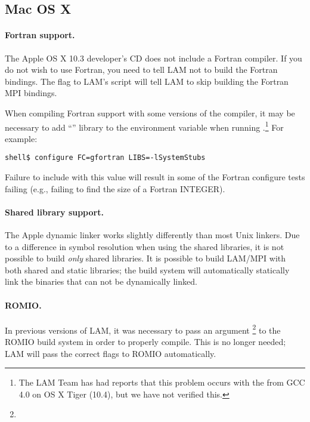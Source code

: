 \subsection{Mac OS X}

\paragraph{Fortran support.} The Apple OS X 10.3 developer's CD does
not include a Fortran compiler.  If you do not wish to use Fortran,
you need to tell LAM not to build the Fortran bindings.  The
 flag to LAM's  script will tell
LAM to skip building the Fortran MPI bindings.


When compiling Fortran support with some versions of the
 compiler, it may be necessary to add
``'' library to the  environment
variable when running .\footnote{The LAM Team has had
  reports that this problem occurs with the  from GCC
  4.0 on OS X Tiger (10.4), but we have not verified this.}  For
example:

\lstset{style=lam-cmdline}
\begin{lstlisting}
shell$ configure FC=gfortran LIBS=-lSystemStubs
\end{lstlisting}

Failure to include  with this value will result in some
of the Fortran configure tests failing (e.g., failing to find the size
of a Fortran INTEGER).

\paragraph{Shared library support.} The Apple dynamic linker works
slightly differently than most Unix linkers.  Due to a difference in
symbol resolution when using the shared libraries, it is not possible
to build {\em only} shared libraries.  It is possible to build LAM/MPI
with both shared and static libraries; the build system will
automatically statically link the binaries that can not be dynamically
linked.

\paragraph{ROMIO.} In previous versions of LAM, it was necessary to
pass an argument \footnote{}
to the ROMIO build system in order to properly compile.  This is no
longer needed; LAM will pass the correct flags to ROMIO automatically.


